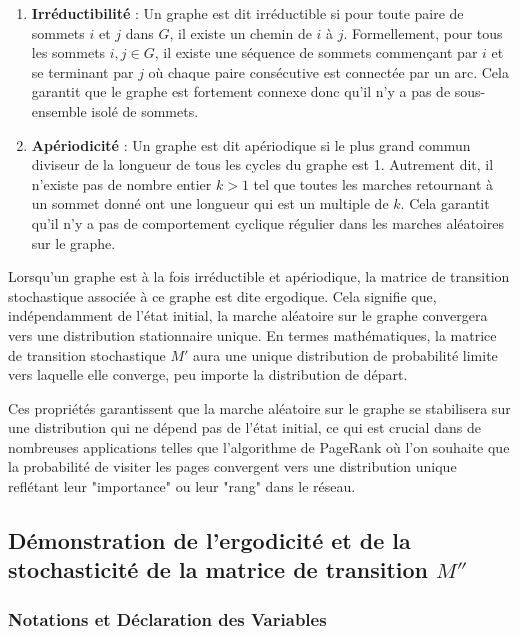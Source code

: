 \begin{enumerate}
    \item \textbf{Irréductibilité} : Un graphe est dit irréductible si pour toute paire de sommets $i$ et $j$ dans $G$, il existe un chemin de $i$ à $j$. Formellement, pour tous les sommets $i, j \in G$, il existe une séquence de sommets commençant par $i$ et se terminant par $j$ où chaque paire consécutive est connectée par un arc. Cela garantit que le graphe est fortement connexe donc qu'il n'y a pas de sous-ensemble isolé de sommets.

    \item \textbf{Apériodicité} : Un graphe est dit apériodique si le plus grand commun diviseur de la longueur de tous les cycles du graphe est 1. Autrement dit, il n'existe pas de nombre entier $k > 1$ tel que toutes les marches retournant à un sommet donné ont une longueur qui est un multiple de $k$. Cela garantit qu'il n'y a pas de comportement cyclique régulier dans les marches aléatoires sur le graphe.
\end{enumerate}

Lorsqu'un graphe est à la fois irréductible et apériodique, la matrice de transition stochastique associée à ce graphe est dite ergodique. Cela signifie que, indépendamment de l'état initial, la marche aléatoire sur le graphe convergera vers une distribution stationnaire unique. En termes mathématiques, la matrice de transition stochastique $M'$ aura une unique distribution de probabilité limite vers laquelle elle converge, peu importe la distribution de départ.

Ces propriétés garantissent que la marche aléatoire sur le graphe se stabilisera sur une distribution qui ne dépend pas de l'état initial, ce qui est crucial dans de nombreuses applications telles que l'algorithme de PageRank où l'on souhaite que la probabilité de visiter les pages convergent vers une distribution unique reflétant leur "importance" ou leur "rang" dans le réseau.

\subsection{Démonstration de l'ergodicité et de la stochasticité de la matrice de transition $M''$}

\subsubsection{Notations et Déclaration des Variables}

